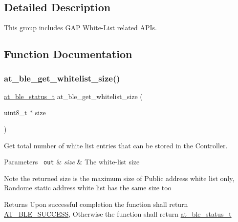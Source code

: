 \subsection{Detailed Description}
This group includes G\+AP White-\/\+List related A\+P\+Is. 



\subsection{Function Documentation}
\mbox{\label{group__gap__whitelist__group_ga42b6dd0c5c1d8e69b0e1d76173f6cb98}} 
\subsubsection{\texorpdfstring{at\_ble\_get\_whitelist\_size()}{at\_ble\_get\_whitelist\_size()}}
{\footnotesize\ttfamily \mbox{\hyperlink{group__error__codes__group_ga3b1db9b95feb157b3c188ca27fe76988}{at\+\_\+ble\+\_\+status\+\_\+t}} at\+\_\+ble\+\_\+get\+\_\+whitelist\+\_\+size (\begin{DoxyParamCaption}\item[{uint8\+\_\+t $\ast$}]{size }\end{DoxyParamCaption})}



Get total number of white list entries that can be stored in the Controller. 


\begin{DoxyParams}[1]{Parameters}
\mbox{\texttt{ out}}  & {\em size} & The white-\/list size\\
\hline
\end{DoxyParams}
\begin{DoxyNote}{Note}
the returned size is the maximum size of Public address white list only, Randome static address white list has the same size too
\end{DoxyNote}
\begin{DoxyReturn}{Returns}
Upon successful completion the function shall return \mbox{\hyperlink{group__error__codes__group_gga3b1db9b95feb157b3c188ca27fe76988a7e3bfff5387331cd4f2c56cbcbbd7e19}{A\+T\+\_\+\+B\+L\+E\+\_\+\+S\+U\+C\+C\+E\+SS}}, Otherwise the function shall return \mbox{\hyperlink{at__ble__api_8h_ace24eb4e5ca3f325c663b809da5feb92}{at\+\_\+ble\+\_\+status\+\_\+t}} 
\end{DoxyReturn}
\mbox{\label{group__gap__whitelist__group_ga9c03fafebf456d7cdc4c0f66e87a2847}} 
